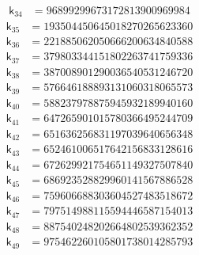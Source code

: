 \[
\begin{aligned}
\mathsf{k}_{34} &={} 96899299673172813900969984
\end{aligned}
\]
\[
\begin{aligned}
\mathsf{k}_{35} &={} 193504450645018270265623360
\end{aligned}
\]
\[
\begin{aligned}
\mathsf{k}_{36} &={} 221885062050666200634840588
\end{aligned}
\]
\[
\begin{aligned}
\mathsf{k}_{37} &={} 379803344151802263741759336
\end{aligned}
\]
\[
\begin{aligned}
\mathsf{k}_{38} &={} 387008901290036540531246720
\end{aligned}
\]
\[
\begin{aligned}
\mathsf{k}_{39} &={} 576646188893131060318065573
\end{aligned}
\]
\[
\begin{aligned}
\mathsf{k}_{40} &={} 588237978875945932189940160
\end{aligned}
\]
\[
\begin{aligned}
\mathsf{k}_{41} &={} 647265901015780366495244709
\end{aligned}
\]
\[
\begin{aligned}
\mathsf{k}_{42} &={} 651636256831197039640656348
\end{aligned}
\]
\[
\begin{aligned}
\mathsf{k}_{43} &={} 652461006517642156833128616
\end{aligned}
\]
\[
\begin{aligned}
\mathsf{k}_{44} &={} 672629921754651149327507840
\end{aligned}
\]
\[
\begin{aligned}
\mathsf{k}_{45} &={} 686923528829960141567886528
\end{aligned}
\]
\[
\begin{aligned}
\mathsf{k}_{46} &={} 759606688303604527483518672
\end{aligned}
\]
\[
\begin{aligned}
\mathsf{k}_{47} &={} 797514988115594446587154013
\end{aligned}
\]
\[
\begin{aligned}
\mathsf{k}_{48} &={} 887540248202664802539362352
\end{aligned}
\]
\[
\begin{aligned}
\mathsf{k}_{49} &={} 975462260105801738014285793
\end{aligned}
\]
